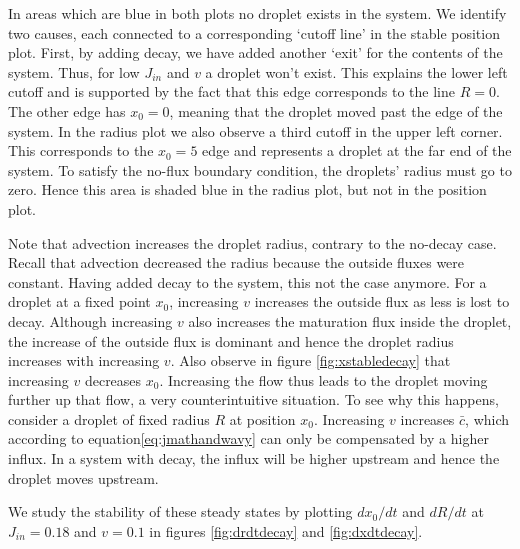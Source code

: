 \documentclass{Dissertate}
\begin{document}
In areas which are blue in both plots no droplet exists in the system.
We identify two causes, each connected to a corresponding `cutoff line'
in the stable position plot. First, by adding decay, we have added
another `exit' for the contents of the system. Thus, for low \(J_{in}\)
and \(v\) a droplet won't exist. This explains the lower left cutoff and
is supported by the fact that this edge corresponds to the line \(R=0\).
The other edge has \(x_0=0\), meaning that the droplet moved past the
edge of the system. In the radius plot we also observe a third cutoff in
the upper left corner. This corresponds to the \(x_0=5\) edge and
represents a droplet at the far end of the system. To satisfy the
no-flux boundary condition, the droplets' radius must go to zero. Hence
this area is shaded blue in the radius plot, but not in the position
plot.

Note that advection increases the droplet radius, contrary to the
no-decay case. Recall that advection decreased the radius because the
outside fluxes were constant. Having added decay to the system, this not
the case anymore. For a droplet at a fixed point \(x_0\), increasing
\(v\) increases the outside flux as less is lost to decay. Although
increasing \(v\) also increases the maturation flux inside the droplet,
the increase of the outside flux is dominant and hence the droplet
radius increases with increasing \(v\). Also observe in figure
\ref{fig:xstabledecay} that increasing \(v\) decreases \(x_0\).
Increasing the flow thus leads to the droplet moving further up that
flow, a very counterintuitive situation. To see why this happens,
consider a droplet of fixed radius \(R\) at position \(x_0\).
Increasing \(v\) increases \(\bar{c}\), which according to equation\ref{eq:jmathandwavy} can only be compensated by a higher influx. In a system with decay, the influx will be higher upstream and hence the droplet moves upstream.

We study the stability of these steady states by plotting \(dx_0/dt\)
and \(dR/dt\) at \(J_{in} = 0.18\) and \(v=0.1\) in figures
\ref{fig:drdtdecay} and \ref{fig:dxdtdecay}.
\end{document}
